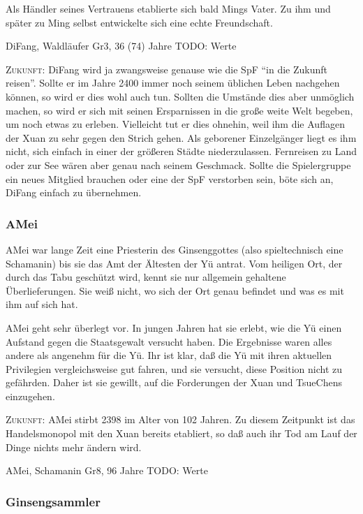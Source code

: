 \documentclass[
a4paper,
twoside,
DIV=calc,
BCOR=4mm,
fontsize=9pt,
twocolumn=on,
titlepage=on,
parskip=half
]{scrartcl}
\begin{document}
Als Händler seines Vertrauens etablierte sich bald Mings Vater. Zu ihm
und später zu Ming selbst entwickelte sich eine echte Freundschaft.

DiFang, Waldläufer Gr3, 36 (74) Jahre
TODO: Werte

\textsc{Zukunft:} DiFang wird ja zwangsweise genause wie die SpF "`in
die Zukunft reisen"'. Sollte er im Jahre 2400 immer noch seinem
üblichen Leben nachgehen können, so wird er dies wohl auch
tun. Sollten die Umstände dies aber unmöglich machen, so wird er sich
mit seinen Ersparnissen in die große weite Welt begeben, um noch etwas
zu erleben. Vielleicht tut er dies ohnehin, weil ihm die Auflagen der
Xuan zu sehr gegen den Strich gehen. Als geborener Einzelgänger liegt
es ihm nicht, sich einfach in einer der größeren Städte
niederzulassen. Fernreisen zu Land oder zur See wären aber genau nach
seinem Geschmack. Sollte die Spielergruppe ein neues Mitglied brauchen
oder eine der SpF verstorben sein, böte sich an, DiFang einfach zu
übernehmen.

\subsubsection{AMei}

AMei war lange Zeit eine Priesterin des Ginsenggottes (also
spieltechnisch eine Schamanin) bis sie das Amt der Ältesten der Yü
antrat. Vom heiligen Ort, der durch das Tabu geschützt wird, kennt sie
nur allgemein gehaltene Überlieferungen. Sie weiß nicht, wo sich der
Ort genau befindet und was es mit ihm auf sich hat.

AMei geht sehr überlegt vor. In jungen Jahren hat sie erlebt, wie die
Yü einen Aufstand gegen die Staatsgewalt versucht haben. Die
Ergebnisse waren alles andere als angenehm für die Yü. Ihr ist klar,
daß die Yü mit ihren aktuellen Privilegien vergleichsweise gut fahren,
und sie versucht, diese Position nicht zu gefährden. Daher ist sie
gewillt, auf die Forderungen der Xuan und TsueChens einzugehen.

\textsc{Zukunft:} AMei stirbt 2398 im Alter von 102 Jahren. Zu diesem
Zeitpunkt ist das Handelsmonopol mit den Xuan bereits etabliert, so
daß auch ihr Tod am Lauf der Dinge nichts mehr ändern wird.

AMei, Schamanin Gr8, 96 Jahre
TODO: Werte

\subsubsection{Ginsengsammler}
\end{document}
